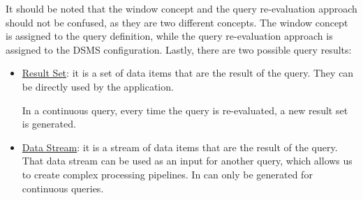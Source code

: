 It should be noted that the window concept and the query re-evaluation approach should not be confused, as they are two different concepts. The window concept is assigned to the query definition, while the query re-evaluation approach is assigned to the DSMS configuration.
Lastly, there are two possible query results:
\begin{itemize}
    \item \ul{Result Set}: it is a set of data items that are the result of the query. They can be directly used by the application.
    
    In a continuous query, every time the query is re-evaluated, a new result set is generated.
    \item \ul{Data Stream}: it is a stream of data items that are the result of the query. That data stream can be used as an input for another query, which allows us to create complex processing pipelines. In can only be generated for continuous queries.
\end{itemize}


